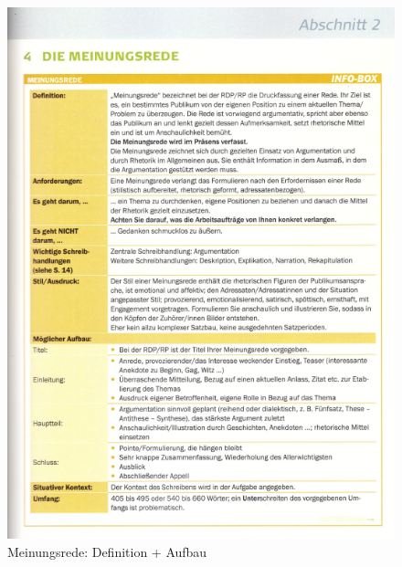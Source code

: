\begin{figure}[h][p]
    \centering
    \includegraphics[scale=0.8]{pics/Screenshot from 2023-02-06 12-29-34.png}
    \caption{Meinungsrede: Definition + Aufbau}
    \label{fig:impl:Meinungsrede1}
\end{figure}

